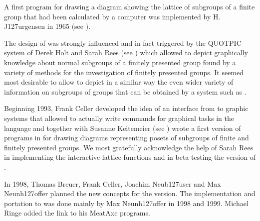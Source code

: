 
A first program for drawing a diagram showing the lattice of subgroups
of  a finite  group  that  had  been   calculated by  a  computer  was
implemented by H. J\accent127urgensen in 1965 (see \cite{FJ65}).

The  design of {\XGAP} was strongly  influenced and  in fact triggered by
the  QUOTPIC system of  Derek Holt  and  Sarah Rees (see \cite{HR91})
%
which allowed to depict graphically knowledge about normal subgroups of a
finitely presented group found by a variety of methods for the investigation
of finitely presented groups.  It seemed most desirable to allow to depict in
a similar way the even wider variety of information on subgroups of groups
that can be obtained by a system such as {\GAP}.

Beginning 1993,  Frank Celler developed the  idea of an interface from
{\GAP}   to graphic systems that  allowed  to actually write commands for
graphical   tasks  in  the {\GAP}  language   and  together with  Susanne
Keitemeier  (see \cite{SK95}) wrote a first version
of   programs in {\XGAP}  for   drawing diagrams  representing posets  of
subgroups of finite and finitely presented groups.  We most gratefully
acknowledge  the  help of  Sarah Rees in  implementing the interactive
lattice functions and in beta testing the {} version of {\XGAP}.

In 1998, Thomas Breuer, Frank Celler, Joachim Neub\accent127user and Max
Neunh\accent127offer planned the new concepts for the {}
version. The implementation and portation to {} was done mainly by Max
Neunh\accent127offer in 1998 and 1999. Michael Ringe added the link to his
MeatAxe programs.

